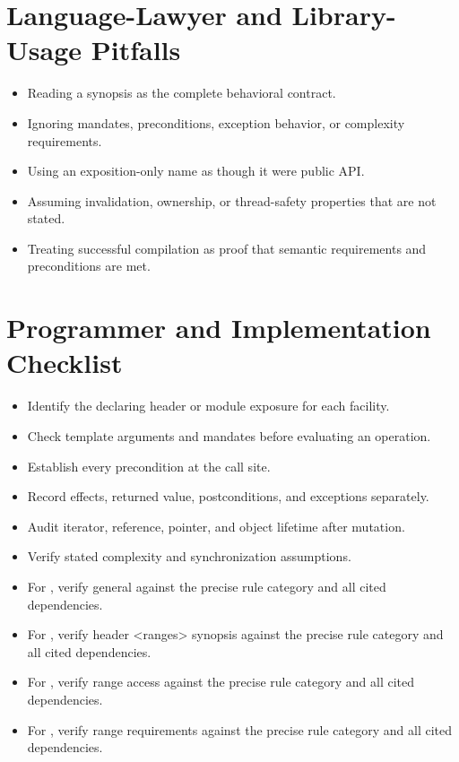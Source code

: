 \documentclass[11pt,letterpaper]{article}
\begin{document}
\section{Language-Lawyer and Library-Usage Pitfalls}
\begin{CornellReferencePitfallBox}\begin{itemize}[label=\textcolor{CornellReferenceAmber}{$\blacktriangleright$}]
\item Reading a synopsis as the complete behavioral contract.
\item Ignoring mandates, preconditions, exception behavior, or complexity requirements.
\item Using an exposition-only name as though it were public API.
\item Assuming invalidation, ownership, or thread-safety properties that are not stated.
\item Treating successful compilation as proof that semantic requirements and preconditions are met.
\end{itemize}\end{CornellReferencePitfallBox}
\section{Programmer and Implementation Checklist}
\begin{CornellReferenceChecklistBox}\begin{itemize}[label=$\square$]
\item Identify the declaring header or module exposure for each facility.
\item Check template arguments and mandates before evaluating an operation.
\item Establish every precondition at the call site.
\item Record effects, returned value, postconditions, and exceptions separately.
\item Audit iterator, reference, pointer, and object lifetime after mutation.
\item Verify stated complexity and synchronization assumptions.
\item For , verify general against the precise rule category and all cited dependencies.
\item For , verify header <ranges> synopsis against the precise rule category and all cited dependencies.
\item For , verify range access against the precise rule category and all cited dependencies.
\item For , verify range requirements against the precise rule category and all cited dependencies.
\end{itemize}\end{CornellReferenceChecklistBox}
\end{document}
